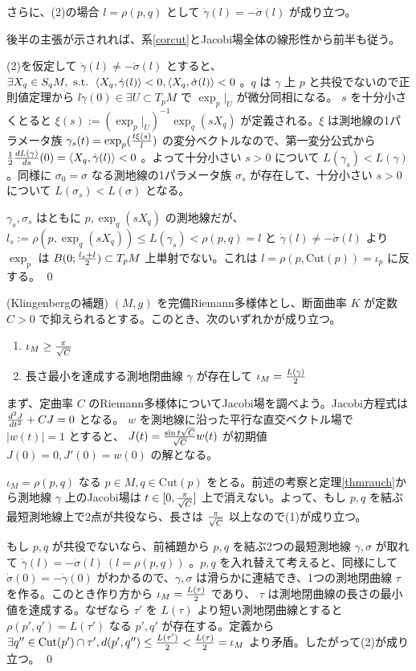 \documentclass[dvipdfmx,a4paper]{jsreport}
\theoremstyle{definition}
\begin{document}
さらに、(2)の場合 $l=\rho(p,q)$ として $\dot{\gamma}(l)=-\dot{\sigma}(l)$ が成り立つ。 

\prf 後半の主張が示されれば、系\ref{corcut}とJacobi場全体の線形性から前半も従う。

(2)を仮定して $\dot{\gamma}(l) \neq -\dot{\sigma}(l)$ とすると、$\exists X_q \in S_qM,\mbox{ s.t. } \ev{X_q,\dot{\gamma}(l)}<0,\ev{X_q,\dot{\sigma}(l)}<0$ 。$q$ は $\gamma$ 上 $p$ と共役でないので正則値定理から $l\dot{\gamma}(0) \in \exists U \subset T_pM$ で $\exp_p|_U$ が微分同相になる。 $s$ を十分小さくとると $\xi(s):=(\exp_p|_U)^{-1}\exp_q(sX_q)$ が定義される。$\xi$ は測地線の1パラメータ族 ${\gamma}_s(t)=\exp_p({t\xi(s) \over l})$ の変分ベクトルなので、第一変分公式から ${1 \over 2}{dL({\gamma}) \over ds}(0)=\ev{X_q,\dot{\gamma}(l)}<0$ 。よって十分小さい $s>0$ について $L({\gamma}_s)<L(\gamma)$ 。同様に $\sigma_0=\sigma$ なる測地線の1パラメータ族 $\sigma_s$ が存在して、十分小さい $s>0$ について $L({\sigma}_s)<L(\sigma)$ となる。

$\gamma_s,\sigma_s$ はともに $p,\exp_q(sX_q)$ の測地線だが、 $l_s:=\rho(p,\exp_q(sX_q)) \leq L(\gamma_s)<\rho(p,q)=l$ と $\dot{\gamma}(l) \neq -\dot{\sigma}(l)$ より $\exp_p$ は $B(0;{l_s+l \over 2}) \subset T_pM$ 上単射でない。これは $l=\rho(p,\mbox{Cut}(p))=\iota_p$ に反する。 \qed 


\thm\label{thmklingenberg} (Klingenbergの補題) $(M,g)$ を完備Riemann多様体とし、断面曲率 $K$ が定数 $C>0$ で抑えられるとする。このとき、次のいずれかが成り立つ。
\begin{enumerate}
    \item $\iota_M \geq {\pi \over \sqrt{C}}$
    \item 長さ最小を達成する測地閉曲線 $\gamma$ が存在して $\iota_M={L(\gamma) \over 2}$
\end{enumerate}

\prf まず、定曲率 $C$ のRiemann多様体についてJacobi場を調べよう。Jacobi方程式は ${d^2 J \over dt^2}+CJ=0$ となる。 $w$ を測地線に沿った平行な直交ベクトル場で $|w(t)|=1$ とすると、 $J(t)={\sin t \sqrt{C} \over \sqrt{C}}w(t)$ が初期値 $J(0)=0,J'(0)=w(0)$ の解となる。

$\iota_M=\rho(p,q)$ なる $p \in M,q \in \mbox{Cut}(p)$ をとる。前述の考察と定理\ref{thmrauch}から測地線 $\gamma$ 上のJacobi場は $t \in [0,{\pi \over \sqrt{C}}]$ 上で消えない。よって、もし $p,q$ を結ぶ最短測地線上で2点が共役なら、長さは ${\pi \over \sqrt{C}}$ 以上なので(1)が成り立つ。

もし $p,q$ が共役でないなら、前補題から $p,q$ を結ぶ2つの最短測地線 $\gamma,\sigma$ が取れて $\dot{\gamma}(l)=-\dot{\sigma}(l)\ (l=\rho(p,q))$ 。$p,q$ を入れ替えて考えると、同様にして $\dot{\sigma}(0)=-\dot{\gamma}(0)$ がわかるので、$\gamma,\sigma$ は滑らかに連結でき、1つの測地閉曲線 $\tau$ を作る。このとき作り方から $\iota_M={L(\tau) \over 2}$ であり、 $\tau$ は測地閉曲線の長さの最小値を達成する。なぜなら $\tau'$ を $L(\tau)$ より短い測地閉曲線とすると $\rho(p',q')=L(\tau')$ なる $p',q'$ が存在する。定義から $\exists q'' \in \mbox{Cut}(p') \cap \tau',d(p',q'') \leq {L(\tau') \over 2}<{L(\tau) \over 2}=\iota_M$ より矛盾。したがって(2)が成り立つ。 \qed 
\end{document}
